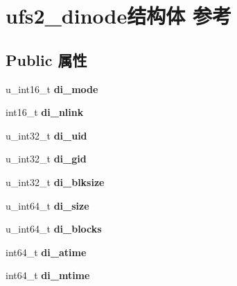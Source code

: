 \hypertarget{structufs2__dinode}{}\section{ufs2\+\_\+dinode结构体 参考}
\label{structufs2__dinode}
\subsection*{Public 属性}
\begin{DoxyCompactItemize}
\item 
\mbox{\label{structufs2__dinode_acb7ed3e4a81ba003ec405439d39a307c}} 
u\+\_\+int16\+\_\+t {\bfseries di\+\_\+mode}
\item 
\mbox{\label{structufs2__dinode_a1398daf0dae2b3f39bc5f821e704ad89}} 
int16\+\_\+t {\bfseries di\+\_\+nlink}
\item 
\mbox{\label{structufs2__dinode_a1e7d5f15243f2c5cd9417275015133dc}} 
u\+\_\+int32\+\_\+t {\bfseries di\+\_\+uid}
\item 
\mbox{\label{structufs2__dinode_a472290444109405d763fbe118772b04a}} 
u\+\_\+int32\+\_\+t {\bfseries di\+\_\+gid}
\item 
\mbox{\label{structufs2__dinode_a2d42d866db3eb9d62bfdcf6b0ec3656e}} 
u\+\_\+int32\+\_\+t {\bfseries di\+\_\+blksize}
\item 
\mbox{\label{structufs2__dinode_ad5993494c57c494293c25dc81ec3b154}} 
u\+\_\+int64\+\_\+t {\bfseries di\+\_\+size}
\item 
\mbox{\label{structufs2__dinode_ad7506242ed5662a02fa2d5a56bc23d63}} 
u\+\_\+int64\+\_\+t {\bfseries di\+\_\+blocks}
\item 
\mbox{\label{structufs2__dinode_ad67448875ad440786911390a794a2aa3}} 
int64\+\_\+t {\bfseries di\+\_\+atime}
\item 
\mbox{\label{structufs2__dinode_a690cc5a8f259046da56dcfa9c138898d}} 
int64\+\_\+t {\bfseries di\+\_\+mtime}
\item 

\end{DoxyCompactItemize}
